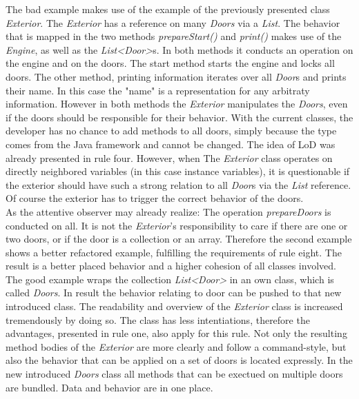 The bad example makes use of the example of the previously presented class \textit{Exterior}. The \textit{Exterior} has a reference on many \textit{Doors} via a \textit{List}. The behavior that is mapped in the two methods \textit{prepareStart()} and \textit{print()} makes use of the \textit{Engine}, as well as the \textit{List<Door>}s. In both methods it conducts an operation on the engine and on the doors. The start method starts the engine and locks all doors. The other method, printing information iterates over all \textit{Door}s and prints their name. In this case the "name" is a representation for any arbitraty information. However in both methods the \textit{Exterior} manipulates the \textit{Doors}, even if the doors should be responsible for their behavior. With the current classes, the developer has no chance to add methods to all doors, simply because the type comes from the Java framework and cannot be changed. The idea of \ac{LoD} was already presented in rule four. However, when The \textit{Exterior} class operates on directly neighbored variables (in this case instance variables), it is questionable if the exterior should have such a strong relation to all \textit{Door}s via the \textit{List} reference. Of course the exterior has to trigger the correct behavior of the doors. 
\\

As the attentive observer may already realize: The operation \textit{prepareDoors} is conducted on all. It is not the \textit{Exterior}'s responsibility to care if there are one or two doors, or if the door is a collection or an array. Therefore the second example shows a better refactored example, fulfilling the requirements of rule eight. The result is a better placed behavior and a higher cohesion of all classes involved.
\\

The good example wraps the collection \textit{List<Door>} in an own class, which is called \textit{Doors}. In result the behavior relating to door can be pushed to that new introduced class. The readability and overview of the \textit{Exterior} class is increased tremendously by doing so. The class has less intentiations, therefore the advantages, presented in rule one, also apply for this rule. Not only the resulting method bodies of the \textit{Exterior} are more clearly and follow a command-style, but also the behavior that can be applied on a set of doors is located expressly.
In the new introduced \textit{Doors} class all methods that can be exectued on multiple doors are bundled. Data and behavior are in one place. 
\\


